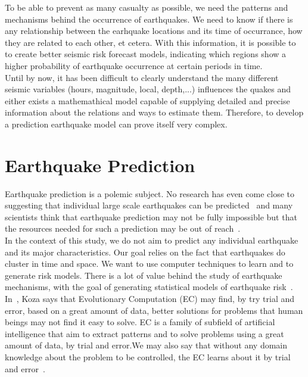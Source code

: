 To be able to prevent as many casualty as possible, we need the patterns and mechanisms behind the occurrence of earthquakes. We need to know if there is any relationship between the earhquake locations and its time of occurrance, how they are related to each other, et cetera. With this information, it is possible to to create better seismic risk forecast models, indicating which regions show a higher probability of earthquake occurrence at certain periods in time. \\

Until by now, it has been difficult to clearly understand the many different seismic variables (hours, magnitude, local, depth,...) influences the quakes and either exists a mathemathical model capable of supplying detailed and precise information about the relations and ways to estimate them. Therefore, to develop a prediction earthquake model can prove itself very complex.\\

\section{Earthquake Prediction}

Earthquake prediction is a polemic subject. No research has even come close to suggesting that individual large scale earthquakes can be predicted~\cite{ecta14} and many scientists think that earthquake prediction may not be fully impossible but that the resources needed for such a prediction may be out of reach~\cite{eberhard2014multiscale}.\\

In the context of this study, we do not aim to predict any individual earthquake and its major characteristics. Our goal relies on the fact that earthquakes do cluster in time and space. We want to use computer techniques to learn and to generate risk models. There is a lot of value behind the study of earthquake mechanisms, with the goal of generating statistical models of earthquake risk~\cite{Nature1999}.\\

In~\cite{Koza2003}, Koza says that Evolutionary Computation (EC) may find, by try trial and error, based on a great amount of data, better solutions for problems that human beings may not find it easy to solve. EC is a family of subfield of artificial intelligence that aim to extract patterns and to solve problems using a great amount of data, by trial and error.We may also say that without any domain knowledge about the problem to be controlled, the EC learns about it by trial and error~\cite{Michie94machinelearning}.\\


